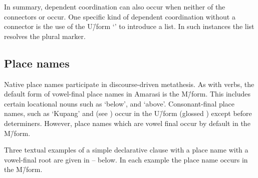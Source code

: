 In summary, dependent coordination can also occur when
neither of the connectors  or  occur.
One specific kind of dependent coordination without a connector
is the use of the U\=/form  `{\ein}' to introduce a list.
In such instances the list resolves the plural marker.

\subsection{Place names}
Native place names participate in discourse-driven metathesis.
As with verbs, the default form of vowel-final place names in Amarasi is the M\=/form.
This includes certain locational nouns
such as  {\ra}  `below',
and  {\ra}  `above'.
Consonant-final place names, such as  `Kupang' and
 (see )
occur in the U\=/form (glossed {\Uc}) except before determiners.
However, place names which are vowel final occur by default in the M\=/form.

Three textual examples of a simple declarative
clause with a place name with a vowel-final root are given in
-- below.
In each example the place name occurs in the M\=/form.

\begin{exe}
	\label{ex:130825-8, 1.00}
	\label{ex:130907-3, 5.31}
	\label{ex:160326, 17.41}
\end{exe}

